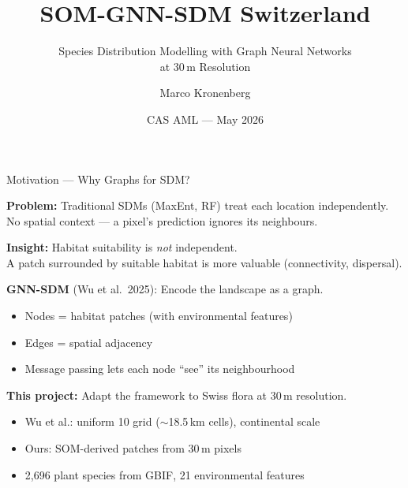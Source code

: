 \documentclass[aspectratio=169,11pt]{beamer}
\title{SOM-GNN-SDM Switzerland}
\subtitle{Species Distribution Modelling with Graph Neural Networks\\at 30\,m Resolution}
\author{Marco Kronenberg}
\date{CAS AML --- May 2026}
\begin{document}
\begin{frame}
\titlepage
\end{frame}

\begin{frame}{Motivation --- Why Graphs for SDM?}

\textbf{Problem:} Traditional SDMs (MaxEnt, RF) treat each location independently.\\
No spatial context --- a pixel's prediction ignores its neighbours.

\bigskip

\textbf{Insight:} Habitat suitability is \emph{not} independent.\\
A patch surrounded by suitable habitat is more valuable (connectivity, dispersal).

\bigskip

\textbf{GNN-SDM} (Wu et al.\ 2025): Encode the landscape as a graph.
\begin{itemize}
  \item Nodes = habitat patches (with environmental features)
  \item Edges = spatial adjacency
  \item Message passing lets each node ``see'' its neighbourhood
\end{itemize}

\bigskip

\textbf{This project:} Adapt the framework to Swiss flora at 30\,m resolution.
\begin{itemize}
  \item Wu et al.: uniform 10\textquotesingle{} grid ($\sim$18.5\,km cells), continental scale
  \item Ours: SOM-derived patches from 30\,m pixels
  \item 2,696 plant species from GBIF, 21 environmental features
\end{itemize}

\end{frame}
\end{document}
